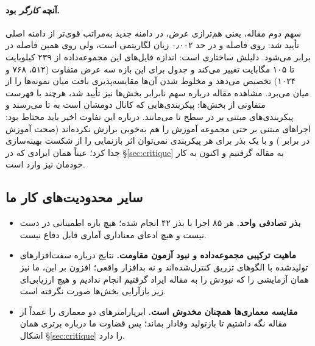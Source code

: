 \paragraph{آنچه \emph{کارگر} بود.} سهم دوم مقاله، یعنی هم‌ترازی عرض، در دامنه جدید به‌مراتب قوی‌تر از دامنه اصلی تأیید شد: روی  فاصله  و  در حد \num{۰٫۰۰۲} زیان لگاریتمی است، ولی روی  همین فاصله  در برابر  می‌شود. دلیلش ساختاری است: اندازه فایل‌های این مجموعه‌داده از \num{۲۳۹} کیلوبایت تا \num{۱۰۵} مگابایت تغییر می‌کند و جدول  برای این بازه سه عرض متفاوت (\num{۵۱۲}، \num{۷۶۸} و \num{۱۰۲۴}) تخصیص می‌دهد و مخلوط شدن آن‌ها مقایسه‌پذیری بافت میان نمونه‌ها را از میان می‌برد. مشاهده مقاله درباره سهم نابرابر بخش‌ها نیز تأیید شد، هرچند با فهرست متفاوتی از بخش‌ها: پیکربندی‌هایی که کانال دومشان  است به  تا  می‌رسند و پیکربندی‌های مبتنی بر  در سطح  تا  می‌مانند. درباره این تفاوت اخیر باید محتاط بود: اجرا‌های مبتنی بر  حتی مجموعه آموزش را هم به‌خوبی برازش نکرده‌اند (صحت آموزش  در برابر ) و با یک بذر برای هر پیکربندی نمی‌توان اثر بازنمایی را از شکست بهینه‌سازی جدا کرد؛ عیناً همان ایرادی که در \S\ref{sec:critique} به مقاله گرفتیم و اکنون به کار خودمان نیز وارد است.

\subsection{سایر محدودیت‌های کار ما}
\begin{itemize}[leftmargin=1.4em,itemsep=0.15em,topsep=0.25em]
    \item \textbf{بذر تصادفی واحد.} هر ۸۵ اجرا با بذر \num{۴۲} انجام شده؛ هیچ بازه اطمینانی در دست نیست و هیچ ادعای معناداری آماری قابل دفاع نیست.
    \item \textbf{ماهیت ترکیبی مجموعه‌داده و نبود آزمون مقاومت.} نتایج درباره سفت‌افزار‌های تولیدشده با الگو‌های تزریق کنترل‌شده‌اند و نه بدافزار واقعی؛ افزون بر این، ما نیز همان آزمایشی را که نبودش را به مقاله ایراد گرفتیم انجام ندادیم و هیچ ارزیابی‌ای زیر بازآرایی بخش‌ها صورت نگرفته است.
    \item \textbf{مقایسه معماری‌ها همچنان مخدوش است.} ابرپارامتر‌های دو معماری را عمداً از مقاله نگه داشتیم تا بازتولید وفادار بماند؛ پس قضاوت ما درباره برتری  همان اشکال \S\ref{sec:critique} را دارد.
\end{itemize}
